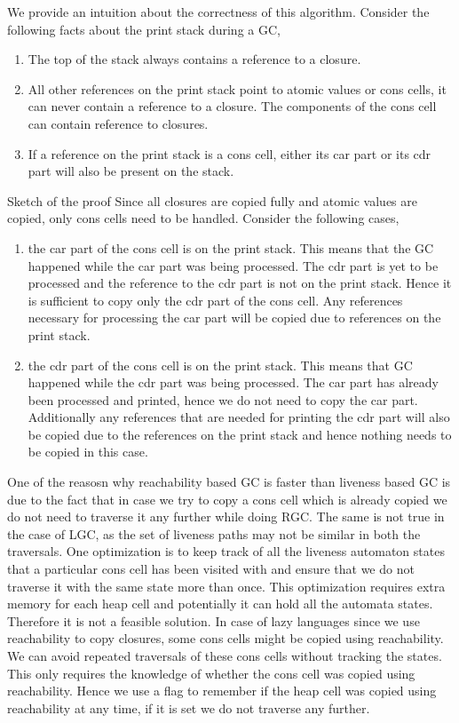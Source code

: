 \documentclass[10pt]{sigplanconf}
\begin{document}
We provide an intuition about the correctness of this algorithm. Consider the following facts about the print stack 
during a GC,
\begin{enumerate}
\item The top of the stack always contains a reference to a closure.
\item All other references on the print stack point to atomic values or cons cells, it can never contain a
reference to a closure. The components of the cons cell can contain reference to closures.
\item If a reference on the print stack is a cons cell, either its car part or its cdr part will also be 
present on the stack.
\end{enumerate}
Sketch of the proof
Since all closures are copied fully and atomic values are copied, only cons cells need to be handled. 
Consider the following cases,
\begin{enumerate}
\item the car part of the cons cell is on the print stack. This means that the GC happened while 
the car part was being processed. The cdr part is yet to be processed and the reference to the cdr part 
is not on the print stack. Hence it is sufficient to copy only the cdr part of the cons cell. Any references 
necessary for processing the car part will be copied due to references on the print stack.
\item the cdr part of the cons cell is on the print stack. This means that GC happened while 
the cdr part was being processed.  The car part has already been processed and printed, hence we do not 
need to copy the car part. Additionally any references that are needed for printing the cdr part will 
also be copied due to the references on the print stack and hence nothing needs to be copied in this case.
\end{enumerate}
One of the reasosn why reachability based GC is faster than liveness based GC is due to the fact that 
in case we try to copy a cons cell which is already copied we do not need to traverse it any further while
 doing RGC. The same is not true in the case of LGC, as the set of liveness paths may not be similar in 
both the traversals. One optimization is to keep track of all the liveness automaton states that a particular 
cons cell has been visited with and ensure that we do not traverse it with the same state more than once. 
This optimization requires extra memory for each heap cell and potentially it can hold all the automata states. 
Therefore it is not a feasible solution. In case of lazy languages since we use reachability to copy closures, 
some cons cells might be copied using reachability. We can avoid repeated traversals of these cons cells without 
tracking the states. This only requires the knowledge of whether the cons cell was copied using reachability. 
Hence we use a flag to remember if the heap cell was copied using reachability at any time, if it is set we do 
not traverse any further.
\end{document}
